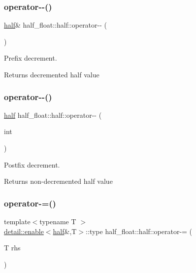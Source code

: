 \subsubsection{\texorpdfstring{operator-\/-\/()}{operator--()}\hspace{0.1cm}{\footnotesize\ttfamily [1/2]}}
{\footnotesize\ttfamily \hyperlink{classhalf__float_1_1half}{half}\& half\+\_\+float\+::half\+::operator-\/-\/ (\begin{DoxyParamCaption}{ }\end{DoxyParamCaption})\hspace{0.3cm}{\ttfamily [inline]}}

Prefix decrement. \begin{DoxyReturn}{Returns}
decremented half value 
\end{DoxyReturn}
\mbox{\label{classhalf__float_1_1half_ae89579e80863e11ad9aae90e7883d4cd}} 
\subsubsection{\texorpdfstring{operator-\/-\/()}{operator--()}\hspace{0.1cm}{\footnotesize\ttfamily [2/2]}}
{\footnotesize\ttfamily \hyperlink{classhalf__float_1_1half}{half} half\+\_\+float\+::half\+::operator-\/-\/ (\begin{DoxyParamCaption}\item[{int}]{ }\end{DoxyParamCaption})\hspace{0.3cm}{\ttfamily [inline]}}

Postfix decrement. \begin{DoxyReturn}{Returns}
non-\/decremented half value 
\end{DoxyReturn}
\mbox{\label{classhalf__float_1_1half_a86647595e63e3d0bac1c4b17a3fe162e}} 
\subsubsection{\texorpdfstring{operator-\/=()}{operator-=()}\hspace{0.1cm}{\footnotesize\ttfamily [1/2]}}
{\footnotesize\ttfamily template$<$typename T $>$ \\
\hyperlink{structhalf__float_1_1detail_1_1enable}{detail\+::enable}$<$\hyperlink{classhalf__float_1_1half}{half}\&,T$>$\+::type half\+\_\+float\+::half\+::operator-\/= (\begin{DoxyParamCaption}\item[{T}]{rhs }\end{DoxyParamCaption})\hspace{0.3cm}{\ttfamily [inline]}}

